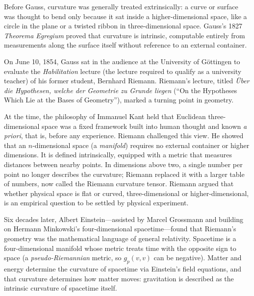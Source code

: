 \begin{historybox}
Before Gauss, curvature was generally treated extrinsically: a curve or surface was thought to bend only because it sat inside a higher-dimensional space, like a circle in the plane or a twisted ribbon in three-dimensional space. Gauss's 1827 \emph{Theorema Egregium} proved that curvature is intrinsic, computable entirely from measurements along the surface itself without reference to an external container.

On June 10, 1854, Gauss sat in the audience at the University of G\"ottingen to evaluate the \emph{Habilitation} lecture (the lecture required to qualify as a university teacher) of his former student, Bernhard Riemann. Riemann's lecture, titled \emph{\"Uber die Hypothesen, welche der Geometrie zu Grunde liegen} (``On the Hypotheses Which Lie at the Bases of Geometry''), marked a turning point in geometry.

At the time, the philosophy of Immanuel Kant held that Euclidean three-dimensional space was a fixed framework built into human thought and known \emph{a priori}, that is, before any experience. Riemann challenged this view. He showed that an $n$-dimensional space (a \emph{manifold}) requires no external container or higher dimensions. It is defined intrinsically, equipped with a metric that measures distances between nearby points. In dimensions above two, a single number per point no longer describes the curvature; Riemann replaced it with a larger table of numbers, now called the Riemann curvature tensor. Riemann argued that whether physical space is flat or curved, three-dimensional or higher-dimensional, is an empirical question to be settled by physical experiment.

Six decades later, Albert Einstein---assisted by Marcel Grossmann and building on Hermann Minkowski's four-dimensional spacetime---found that Riemann's geometry was the mathematical language of general relativity. Spacetime is a four-dimensional manifold whose metric treats time with the opposite sign to space (a \emph{pseudo-Riemannian} metric, so $g_p(v, v)$ can be negative). Matter and energy determine the curvature of spacetime via Einstein's field equations, and that curvature determines how matter moves: gravitation is described as the intrinsic curvature of spacetime itself.


\end{historybox}
